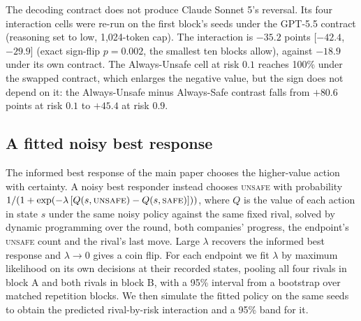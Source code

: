 \documentclass{article}
\newcommand{\Safe}{\textsc{safe}}
\newcommand{\Unsafe}{\textsc{unsafe}}
\begin{document}
The decoding contract does not produce Claude Sonnet 5's reversal. Its four
interaction cells were re-run on the first block's seeds under the GPT-5.5
contract (reasoning set to low, 1{,}024-token cap). The interaction is $-35.2$
points [$-42.4$, $-29.9$] (exact sign-flip $p=0.002$, the smallest ten blocks
allow), against $-18.9$ under its own contract. The Always-Unsafe cell at risk
$0.1$ reaches 100\% under the swapped contract, which enlarges the negative
value, but the sign does not depend on it: the Always-Unsafe minus Always-Safe
contrast falls from $+80.6$ points at risk $0.1$ to $+45.4$ at risk $0.9$.

\subsection{A fitted noisy best response}
\label{sec:supp-quantal}

The informed best response of the main paper chooses the higher-value action with
certainty. A noisy best responder instead chooses \Unsafe{} with probability
$1/(1+\exp(-\lambda\,[Q(s,\Unsafe)-Q(s,\Safe)]))$, where $Q$ is the value of
each action in state $s$ under the same noisy policy against the same fixed
rival, solved by dynamic programming over the round, both companies' progress,
the endpoint's \Unsafe{} count and the rival's last move. Large $\lambda$
recovers the informed best response and $\lambda\to 0$ gives a coin flip. For each
endpoint we fit $\lambda$ by maximum likelihood on its own decisions at their
recorded states, pooling all four rivals in block A and both rivals in block B,
with a 95\% interval from a bootstrap over matched repetition blocks. We then
simulate the fitted policy on the same seeds to obtain the predicted
rival-by-risk interaction and a 95\% band for it.
\end{document}
